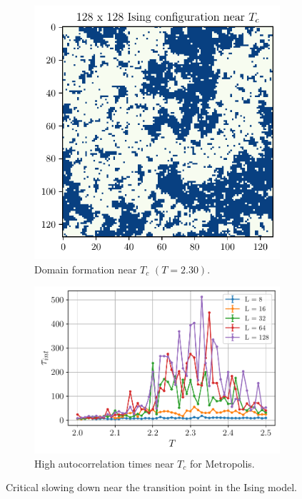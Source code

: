 \documentclass[../thesis_main.tex]{subfiles}
\begin{document}
\begin{figure}[!htb]
    \centering
    \begin{subfigure}[b]{0.4\textwidth}  %
        \centering
        \includegraphics[width=\textwidth]{images/monte_carlo/ising_config_128.pdf}
        \caption{Domain formation near $T_c$ $(T=2.30)$.}
        \label{domain}
    \end{subfigure}
    \hspace{1em}  %
    \begin{subfigure}[b]{0.5\textwidth}
        \centering
        \includegraphics[width=\textwidth]{images/monte_carlo/metropolis_autocorr_time.pdf}
        \caption{High autocorrelation times near $T_c$ for Metropolis.}
        \label{autocorr_metropolis}
    \end{subfigure}
    \caption{Critical slowing down near the transition point in the Ising model.}
    \label{}
\end{figure}
\end{document}
